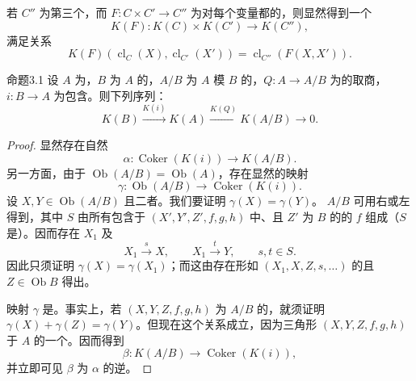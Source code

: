若 $C''$ 为第三个，而 $F:C\times C'\to C''$ 为对每个变量都的，则显然得到一个
\[
K(F):K(C)\times K(C')\longrightarrow K(C''),
\]
满足关系
\[
K(F)(\operatorname{cl}_C(X),\operatorname{cl}_{C'}(X'))
=\operatorname{cl}_{C''}(F(X,X')).
\]

\begin{SGAresult}{命题}{3.1}
设 $A$ 为，$B$ 为 $A$ 的，$A/B$ 为 $A$ 模 $B$ 的，$Q:A\to A/B$ 为的取商，$i:B\to A$ 为包含。则下列序列：
\[
K(B)\xrightarrow{K(i)}K(A)\xrightarrow{K(Q)}K(A/B)\longrightarrow0.
\]
\end{SGAresult}
\begin{proof}
显然存在自然
\[
\alpha:\operatorname{Coker}(K(i))\longrightarrow K(A/B).
\]
另一方面，由于 $\operatorname{Ob}(A/B)=\operatorname{Ob}(A)$，存在显然的映射
\[
\gamma:\operatorname{Ob}(A/B)\longrightarrow\operatorname{Coker}(K(i)).
\]
设 $X,Y\in\operatorname{Ob}(A/B)$ 且二者。我们要证明 $\gamma(X)=\gamma(Y)$。 $A/B$ 可用右或左得到，其中 $S$ 由所有包含于 $(X',Y',Z',f,g,h)$ 中、且 $Z'$ 为 $B$ 的的 $f$ 组成（$S$ 是）。因而存在 $X_1$ 及
\[
X_1\xrightarrow{s}X,\qquad X_1\xrightarrow{t}Y,\qquad s,t\in S.
\]
因此只须证明 $\gamma(X)=\gamma(X_1)$；而这由存在形如 $(X_1,X,Z,s,\ldots)$ 的且 $Z\in\operatorname{Ob}B$ 得出。

映射 $\gamma$ 是。事实上，若 $(X,Y,Z,f,g,h)$ 为 $A/B$ 的，就须证明 $\gamma(X)+\gamma(Z)=\gamma(Y)$。但现在这个关系成立，因为三角形 $(X,Y,Z,f,g,h)$ 于 $A$ 的一个。因而得到
\[
\beta:K(A/B)\longrightarrow\operatorname{Coker}(K(i)),
\]
并立即可见 $\beta$ 为 $\alpha$ 的逆。
\end{proof}

